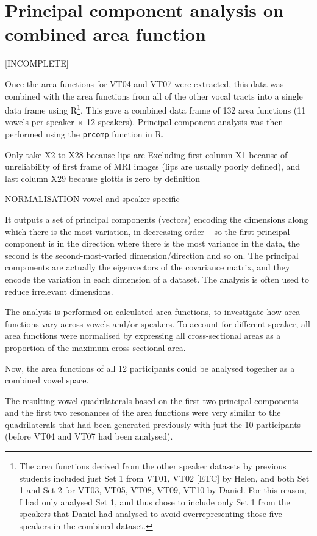 \section{Principal component analysis on combined area function}

[INCOMPLETE]

Once the area functions for VT04 and VT07 were extracted, this data was combined with the area functions from all of the other vocal tracts into a single data frame using R\footnote{The area functions derived from the other speaker datasets by previous students included just Set 1 from VT01, VT02 [ETC] by Helen, and both Set 1 and Set 2 for VT03, VT05, VT08, VT09, VT10 by Daniel. For this reason, I had only analysed Set 1, and thus chose to include only Set 1 from the speakers that Daniel had analysed to avoid overrepresenting those five speakers in the combined dataset.}. This gave a combined data frame of 132 area functions (11 vowels per speaker $\times$ 12 speakers). Principal component analysis was then performed using the \verb|prcomp| function in R. 


Only take X2 to X28 because lips are Excluding first column X1 because of unreliability of first frame of MRI images (lips are usually poorly defined), and last column X29 because glottis is zero by definition


NORMALISATION vowel and speaker specific

It outputs a set of principal components (vectors) encoding the dimensions along which there is the most variation, in decreasing order – so the first principal component is in the direction where there is the most variance in the data, the second is the second-most-varied dimension/direction and so on.
The principal components are actually the eigenvectors of the covariance matrix, and they encode the variation in each dimension of a dataset. The analysis is often used to reduce irrelevant dimensions.

The analysis is performed on calculated area functions, to investigate how area functions vary across vowels and/or speakers.
To account for different speaker, all area functions were normalised by expressing all cross-sectional areas as a proportion of the maximum cross-sectional area.

Now, the area functions of all 12 participants could be analysed together as a combined vowel space. 

The resulting vowel quadrilaterals based on the first two principal components and the first two resonances of the area functions were very similar to the quadrilaterals that had been generated previously with just the 10 participants (before VT04 and VT07 had been analysed).

